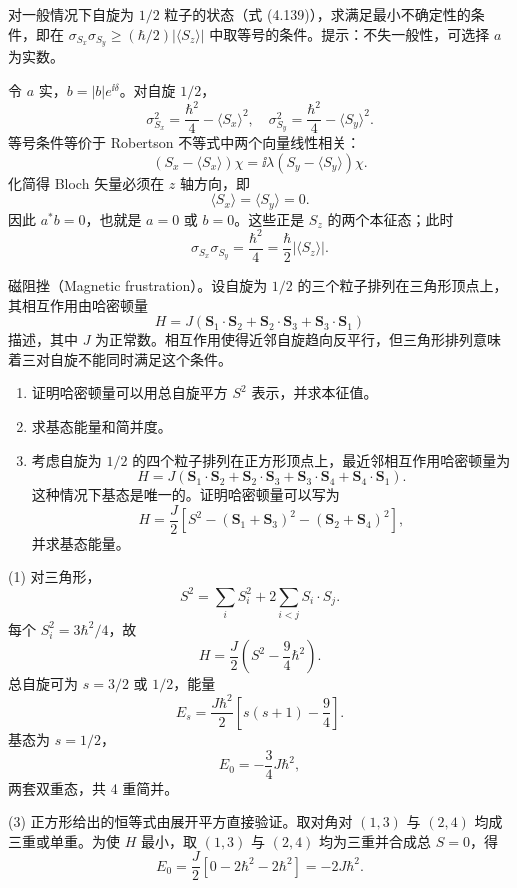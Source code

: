 \begin{question}
对一般情况下自旋为 $1/2$ 粒子的状态（式 (4.139)），求满足最小不确定性的条件，即在 $\sigma_{S_x}\sigma_{S_y}\ge(\hbar/2)|\langle S_z\rangle|$ 中取等号的条件。提示：不失一般性，可选择 $a$ 为实数。

\par\smallskip
{}

\end{question}
\begin{solution}

令 $a$ 实，$b=|b|e^{\ii\delta}$。对自旋 $1/2$，
\[
\sigma_{S_x}^2=\frac{\hbar^2}{4}-\langle S_x\rangle^2,
\quad
\sigma_{S_y}^2=\frac{\hbar^2}{4}-\langle S_y\rangle^2.
\]
等号条件等价于 Robertson 不等式中两个向量线性相关：
\[
(S_x-\langle S_x\rangle)\chi=\ii\lambda(S_y-\langle S_y\rangle)\chi.
\]
化简得 Bloch 矢量必须在 $z$ 轴方向，即
\[
\langle S_x\rangle=
\langle S_y\rangle=0.
\]
因此 $a^*b=0$，也就是 $a=0$ 或 $b=0$。这些正是 $S_z$ 的两个本征态；此时
\[
\sigma_{S_x}\sigma_{S_y}=\frac{\hbar^2}{4}=\frac\hbar2|\langle S_z\rangle|.
\]

\end{solution}

\begin{question}
磁阻挫（Magnetic frustration）。设自旋为 $1/2$ 的三个粒子排列在三角形顶点上，其相互作用由哈密顿量
\[
H=J(\mathbf S_1\cdot\mathbf S_2+\mathbf S_2\cdot\mathbf S_3+\mathbf S_3\cdot\mathbf S_1)
\]
描述，其中 $J$ 为正常数。相互作用使得近邻自旋趋向反平行，但三角形排列意味着三对自旋不能同时满足这个条件。
\begin{enumerate}
\item 证明哈密顿量可以用总自旋平方 $S^2$ 表示，并求本征值。
\item 求基态能量和简并度。
\item 考虑自旋为 $1/2$ 的四个粒子排列在正方形顶点上，最近邻相互作用哈密顿量为
\[
H=J(\mathbf S_1\cdot\mathbf S_2+\mathbf S_2\cdot\mathbf S_3+\mathbf S_3\cdot\mathbf S_4+\mathbf S_4\cdot\mathbf S_1).
\]
这种情况下基态是唯一的。证明哈密顿量可以写为
\[
H=\frac{J}{2}\left[S^2-(\mathbf S_1+\mathbf S_3)^2-(\mathbf S_2+\mathbf S_4)^2\right],
\]
并求基态能量。
\end{enumerate}
\end{question}
\begin{solution}

(1) 对三角形，
\[
S^2=\sum_iS_i^2+2\sum_{i<j}S_i\cdot S_j.
\]
每个 $S_i^2=3\hbar^2/4$，故
\[
H=\frac{J}{2}\left(S^2-\frac{9}{4}\hbar^2\right).
\]
总自旋可为 $s=3/2$ 或 $1/2$，能量
\[
E_s=\frac{J\hbar^2}{2}\left[s(s+1)-\frac94\right].
\]
基态为 $s=1/2$，
\[
E_0=-\frac34J\hbar^2,
\]
两套双重态，共 4 重简并。

(3) 正方形给出的恒等式由展开平方直接验证。取对角对 $(1,3)$ 与 $(2,4)$ 均成三重或单重。为使 $H$ 最小，取 $(1,3)$ 与 $(2,4)$ 均为三重并合成总 $S=0$，得
\[
E_0=\frac{J}{2}[0-2\hbar^2-2\hbar^2]=-2J\hbar^2.
\]

\end{solution}

